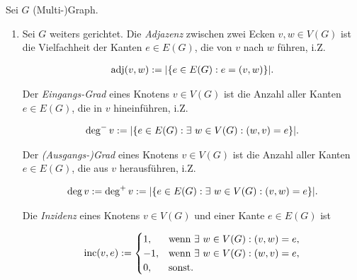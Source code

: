         \begin{definition}

            Sei $G$ (Multi-)Graph.

            \begin{enumerate}[
                wide,
                labelindent = 0pt
            ]

                \item Sei $G$ weiters gerichtet.
                Die \textit{Adjazenz} zwischen zwei Ecken $v, w \in V(G)$ ist die Vielfachheit der Kanten $e \in E(G)$, die von $v$ nach $w$ führen, i.Z.
        
                \begin{align*}
                    \operatorname{adj}(v, w)
                    :=
                    |{\left \{ e \in E(G): e = (v, w) \right \}}|.
                \end{align*}
        
                Der \textit{Eingangs-Grad} eines Knotens $v \in V(G)$ ist die Anzahl aller Kanten $e \in E(G)$, die in $v$ hineinführen, i.Z.
        
                \begin{align*}
                    \deg^- v
                    :=
                    |{\left \{ e \in E(G): \exists ~ w \in V(G): (w, v) = e \right \}}|.
                \end{align*}
        
                Der \textit{(Ausgangs-)Grad} eines Knotens $v \in V(G)$ ist die Anzahl aller Kanten $e \in E(G)$, die aus $v$ herausführen, i.Z.
        
                \begin{align*}
                    \deg v
                    :=
                    \deg^+ v
                    :=
                    |{\left \{ e \in E(G): \exists ~ w \in V(G): (v, w) = e \right \}}|.
                \end{align*}
        
                Die \textit{Inzidenz} eines Knotens $v \in V(G)$ und einer Kante $e \in E(G)$ ist
        
                \begin{align*}
                    \operatorname{inc}(v, e)
                    :=
                    \begin{cases}
                        1, & \text{wenn}~ \exists ~ w \in V(G): (v, w) = e, \\
                        -1, & \text{wenn}~ \exists ~ w \in V(G): (w, v) = e, \\
                        0, & \text{sonst}.
                    \end{cases}
                \end{align*}
        

\end{enumerate}
\end{definition}
